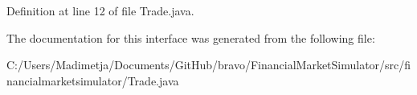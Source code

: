Definition at line 12 of file Trade.\+java.



The documentation for this interface was generated from the following file\+:\begin{DoxyCompactItemize}
\item 
C\+:/\+Users/\+Madimetja/\+Documents/\+Git\+Hub/bravo/\+Financial\+Market\+Simulator/src/financialmarketsimulator/Trade.\+java\end{DoxyCompactItemize}
